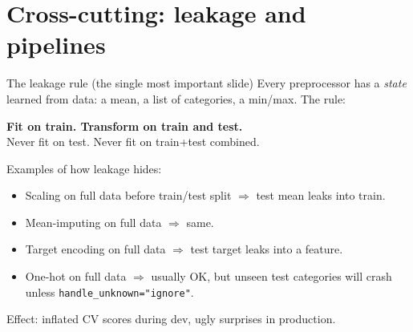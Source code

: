 \documentclass[aspectratio=169]{beamer}
\begin{document}
\section{Cross-cutting: leakage and pipelines}

\begin{frame}{The leakage rule (the single most important slide)}
  Every preprocessor has a \emph{state} learned from data: a mean, a list of categories, a min/max. The rule:
  \vfill
  \begin{center}
    \large
    \textbf{Fit on \textcolor{armblue}{train}. Transform on \textcolor{armred}{train} and \textcolor{armred}{test}.}\\
    Never fit on test. Never fit on train+test combined.
  \end{center}
  \vfill
  Examples of how leakage hides:
  \begin{itemize}
    \item Scaling on full data before train/test split $\Rightarrow$ test mean leaks into train.
    \item Mean-imputing on full data $\Rightarrow$ same.
    \item Target encoding on full data $\Rightarrow$ test target leaks into a feature.
    \item One-hot on full data $\Rightarrow$ usually OK, but unseen test categories will crash unless \texttt{handle\_unknown="ignore"}.
  \end{itemize}
  \vfill
  Effect: inflated CV scores during dev, ugly surprises in production.
\end{frame}
\end{document}
